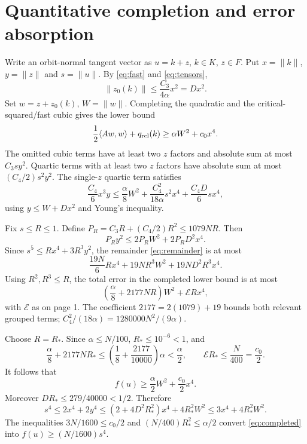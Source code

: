 \documentclass[11pt,a4paper]{article}
\begin{document}
\section{Quantitative completion and error absorption}
Write an orbit-normal tangent vector as $u=k+z$, $k\in K$, $z\in F$. Put $x=\|k\|$, $y=\|z\|$ and $s=\|u\|$. By \eqref{eq:fast} and \eqref{eq:tensors},
\[
\|z_0(k)\|\le\frac{C_3}{4\alpha}x^2=Dx^2.
\]
Set $w=z+z_0(k)$, $W=\|w\|$. Completing the quadratic and the critical-squared/fast cubic gives the lower bound
\[
\frac12\langle Aw,w\rangle+q_{\rm rel}(k)
\ge\alpha W^2+c_0x^4.
\]
The omitted cubic terms have at least two $z$ factors and absolute sum at most $C_3sy^2$. Quartic terms with at least two $z$ factors have absolute sum at most $(C_4/2)s^2y^2$. The single-$z$ quartic term satisfies
\[
\frac{C_4}{6}x^3y\le
\frac\alpha8W^2+\frac{C_4^2}{18\alpha}s^2x^4
+\frac{C_4D}{6}sx^4,
\]
using $y\le W+Dx^2$ and Young's inequality.

Fix $s\le R\le1$. Define $P_R=C_3R+(C_4/2)R^2\le1079NR$. Then
\[
P_Ry^2\le2P_RW^2+2P_RD^2x^4.
\]
Since $s^5\le R x^4+3R^3 y^2$, the remainder \eqref{eq:remainder} is at most
\[
\frac{19N}{6}R x^4+19NR^3W^2+19ND^2R^3x^4.
\]
Using $R^2,R^3\le R$, the total error in the completed lower bound is at most
\begin{equation}\label{eq:totalerror}
\left(\frac\alpha8+2177NR\right)W^2+\mathcal E R x^4,
\end{equation}
with $\mathcal E$ as on page 1. The coefficient $2177=2(1079)+19$ bounds both relevant grouped terms; $C_4^2/(18\alpha)=1280000N^2/(9\alpha)$.

Choose $R=R_*$. Since $\alpha\le N/100$, $R_*\le10^{-6}<1$, and
\[
\frac\alpha8+2177NR_*\le\left(\frac18+\frac{2177}{10000}\right)\alpha
<\frac\alpha2,\qquad
\mathcal E R_*\le\frac N{400}=\frac{c_0}{2}.
\]
It follows that
\begin{equation}\label{eq:completed}
f(u)\ge\frac\alpha2 W^2+\frac{c_0}{2}x^4.
\end{equation}
Moreover $DR_*\le279/40000<1/2$. Therefore
\[
s^4\le2x^4+2y^4\le(2+4D^2R_*^2)x^4+4R_*^2W^2
\le3x^4+4R_*^2W^2.
\]
The inequalities $3N/1600\le c_0/2$ and $(N/400)R_*^2\le\alpha/2$ convert \eqref{eq:completed} into $f(u)\ge(N/1600)s^4$.
\newpage
\end{document}
